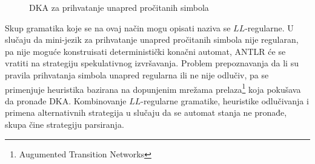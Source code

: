 \begin{figure}[h]
\caption{DKA za prihvatanje unapred pročitanih simbola}
\label{fig:lookahead_dfa}
\end{figure}

Skup gramatika koje se na ovaj način mogu opisati naziva se $LL$-regularne.
U slučaju da mini-jezik za prihvatanje unapred pročitanih simbola nije regularan, pa nije moguće konstruisati deterministički konačni automat, ANTLR će se vratiti na strategiju spekulativnog izvršavanja.
Problem prepoznavanja da li su pravila prihvatanja simbola unapred regularna ili ne nije odlučiv, pa se primenjuje heuristika bazirana na dopunjenim mrežama prelaza\footnote{\eng Augumented Transition Networks} koja pokušava da pronađe DKA.
Kombinovanje $LL$-regularne gramatike, heuristike odlučivanja i primena alternativnih strategija u slučaju da se automat stanja ne pronađe, skupa čine \LLa strategiju parsiranja.
